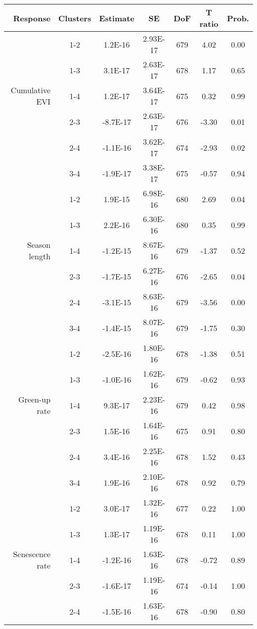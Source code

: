 \begin{table}[H]
\centering
\begin{tabular}{rcccccc}
  \hline
Response & Clusters & Estimate & SE & DoF & T ratio & Prob. \\ 
  \hline
 & 1-2 & 1.2E-16 & 2.93E-17 & 679 & 4.02 & 0.00 \\ 
   & 1-3 & 3.1E-17 & 2.63E-17 & 678 & 1.17 & 0.65 \\ 
  Cumulative EVI & 1-4 & 1.2E-17 & 3.64E-17 & 675 & 0.32 & 0.99 \\ 
   & 2-3 & -8.7E-17 & 2.63E-17 & 676 & -3.30 & 0.01 \\ 
   & 2-4 & -1.1E-16 & 3.62E-17 & 674 & -2.93 & 0.02 \\ 
   & 3-4 & -1.9E-17 & 3.38E-17 & 675 & -0.57 & 0.94 \\ 
   \hline
 & 1-2 & 1.9E-15 & 6.98E-16 & 680 & 2.69 & 0.04 \\ 
   & 1-3 & 2.2E-16 & 6.30E-16 & 680 & 0.35 & 0.99 \\ 
  Season length & 1-4 & -1.2E-15 & 8.67E-16 & 679 & -1.37 & 0.52 \\ 
   & 2-3 & -1.7E-15 & 6.27E-16 & 676 & -2.65 & 0.04 \\ 
   & 2-4 & -3.1E-15 & 8.63E-16 & 679 & -3.56 & 0.00 \\ 
   & 3-4 & -1.4E-15 & 8.07E-16 & 679 & -1.75 & 0.30 \\ 
   \hline
 & 1-2 & -2.5E-16 & 1.80E-16 & 678 & -1.38 & 0.51 \\ 
   & 1-3 & -1.0E-16 & 1.62E-16 & 679 & -0.62 & 0.93 \\ 
  Green-up rate & 1-4 & 9.3E-17 & 2.23E-16 & 679 & 0.42 & 0.98 \\ 
   & 2-3 & 1.5E-16 & 1.64E-16 & 675 & 0.91 & 0.80 \\ 
   & 2-4 & 3.4E-16 & 2.25E-16 & 678 & 1.52 & 0.43 \\ 
   & 3-4 & 1.9E-16 & 2.10E-16 & 678 & 0.92 & 0.79 \\ 
   \hline
 & 1-2 & 3.0E-17 & 1.32E-16 & 677 & 0.22 & 1.00 \\ 
   & 1-3 & 1.3E-17 & 1.19E-16 & 678 & 0.11 & 1.00 \\ 
  Senescence rate & 1-4 & -1.2E-16 & 1.63E-16 & 678 & -0.72 & 0.89 \\ 
   & 2-3 & -1.6E-17 & 1.19E-16 & 674 & -0.14 & 1.00 \\ 
   & 2-4 & -1.5E-16 & 1.63E-16 & 678 & -0.90 & 0.80 \\ 

\end{tabular}
\end{table}
